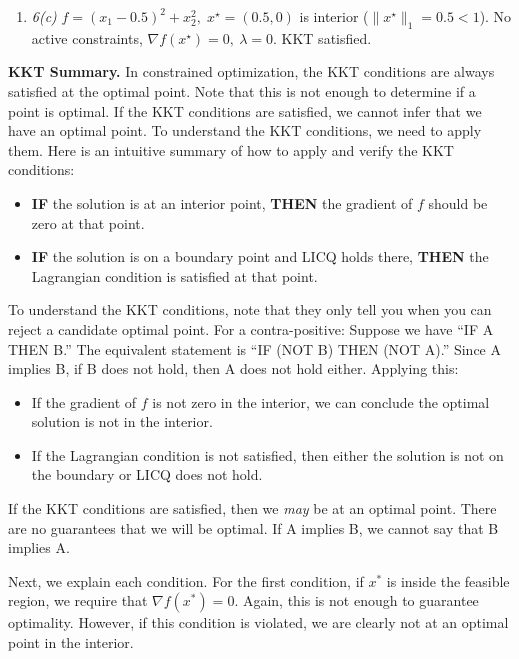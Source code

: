 \documentclass[11pt]{article}
\begin{document}
\begin{enumerate}[label=6(\alph*)]
\begin{enumerate}[label=\arabic*)]
		\item \emph{6(c)} \(f=(x_1-0.5)^2+x_2^2,\; x^\star=(0.5,0)\) is interior (\(\|x^\star\|_1=0.5<1\)).  
		No active constraints, \(\nabla f(x^\star)=0,\ \lambda=0\). KKT satisfied.
	\end{enumerate}
	
	\medskip
	\noindent\textbf{KKT Summary.}
	In constrained optimization, the KKT conditions are always satisfied at the optimal point. Note that this is not enough to determine if a point is optimal. If the KKT conditions are satisfied, we cannot infer that we have an optimal point. To understand the KKT conditions, we need to apply them. Here is an intuitive summary of how to apply and verify the KKT conditions:
	
	\begin{itemize}
		\item \textbf{IF} the solution is at an interior point, \textbf{THEN} the gradient of $f$ should be zero at that point.
		\item \textbf{IF} the solution is on a boundary point and LICQ holds there, \textbf{THEN} the Lagrangian condition is satisfied at that point.
	\end{itemize}
	
	To understand the KKT conditions, note that they only tell you when you can reject a candidate optimal point. For a contra-positive: Suppose we have “IF A THEN B.” The equivalent statement is “IF (NOT B) THEN (NOT A).” Since A implies B, if B does not hold, then A does not hold either. Applying this:
	
	\begin{itemize}
		\item If the gradient of $f$ is not zero in the interior, we can conclude the optimal solution is not in the interior.
		\item If the Lagrangian condition is not satisfied, then either the solution is not on the boundary or LICQ does not hold.
	\end{itemize}
	
	If the KKT conditions are satisfied, then we \emph{may} be at an optimal point. There are no guarantees that we will be optimal. If A implies B, we cannot say that B implies A.
	
	Next, we explain each condition. For the first condition, if $x^*$ is inside the feasible region, we require that $\nabla f(x^*)=0$. Again, this is not enough to guarantee optimality. However, if this condition is violated, we are clearly not at an optimal point in the interior.
	

\end{enumerate}
\end{document}

